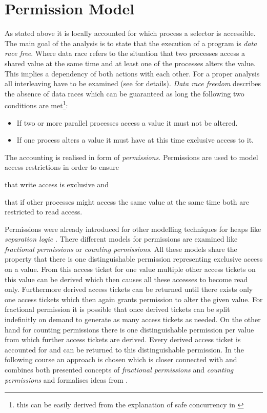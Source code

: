 \section{Permission Model}
	\label{sec:pm}
	As stated above it is locally accounted for which process a selector is
	accessible. The main goal of the analysis is to state that the execution
	of a program is \emph{data race free}. Where data race refers to the
	situation that two processes access a shared value at the same time and at
	least one of the processes alters the value. This implies a dependency of
	both actions with each other. For a proper analysis all interleaving have
	to be examined (see \cite[pp. 77-80]{PrinciplesOfModelChecking} for
	details). \emph{Data race freedom} describes the absence of data races which
	can be guaranteed as long the following two conditions are
	met\footnote{this can be easily derived from the explanation of safe
		concurrency in \cite{SeparationLogic}}:
	\begin{itemize}
		\label{itemize:invariants}
		\item If two or more parallel processes access a value it must not be
			altered.
		\item If one process alters a value it must have at this time exclusive
			access to it.
	\end{itemize}
	The accounting is realised in form of \emph{permissions}. Permissions are
	used to model access restrictions in order to ensure
	\begin{enumerate*}[label=(\arabic*)]
		\item that write access is exclusive and
		\item that if other processes might access the same value at the same
			time both are restricted to read access.
	\end{enumerate*}
	Permissions were already introduced for other modelling techniques for heaps
	like \emph{separation logic} \cite{SeparationLogic}. There different models
	for permissions are examined like \emph{fractional permissions} or
	\emph{counting permissions}. All these models share the property that there
	is one distinguishable permission representing exclusive access on a value.
	From this access ticket for one value multiple other access tickets on this
	value can be derived which then causes all these accesses to become read
	only. Furthermore derived access tickets can be returned until there exists
	only one access tickets which then again grants permission to alter the
	given value.
	For fractional permission it is possible that once derived
	tickets can be split indefinitly on demand to generate as many access
	tickets as needed. On the other hand for counting permissions there is one
	distinguishable permission per value from which further access tickets are
	derived. Every derived access ticket is accounted for and can be returned to
	this distinguishable permission.
	In the following course an approach is chosen which is closer
	connected with \cite{FractionalPermissions} and combines both presented
	concepts of \emph{fractional permissions} and \emph{counting permissions}
	and formalises ideas from \cite{NollJansenDraft}.

